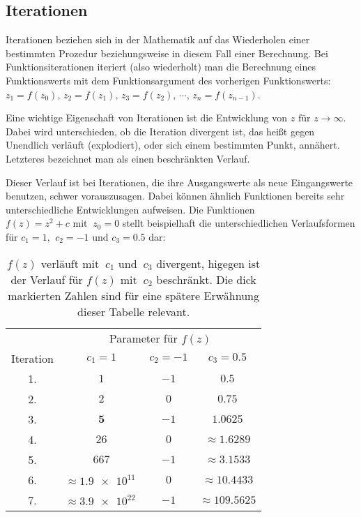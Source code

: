 \subsection{Iterationen}\label{subsec:iterations}

Iterationen beziehen sich in der Mathematik auf das Wiederholen einer bestimmten
Prozedur beziehungsweise in diesem Fall einer Berechnung.
Bei Funktionsiterationen iteriert (also wiederholt) man die Berechnung eines
Funktionswerts mit dem Funktionsargument des vorherigen Funktionswerts:
$z_1 = f(z_0),\, z_2 = f(z_1),\, z_3 = f(z_2),\, \cdots,\, z_n = f(z_{n-1})$.

Eine wichtige Eigenschaft von Iterationen ist die Entwicklung von
$z \text{ für } z \to \infty$.
Dabei wird unterschieden, ob die Iteration divergent ist,
das heißt gegen Unendlich verl\"auft (\glqq explodiert\grqq),
oder sich einem bestimmten Punkt, ann\"ahert.
Letzteres bezeichnet man als einen beschränkten Verlauf.

Dieser Verlauf ist bei Iterationen, die ihre Ausgangswerte als neue Eingangswerte
benutzen, schwer vorauszusagen.
Dabei k\"onnen \"ahnlich Funktionen bereits sehr unterschiedliche Entwicklungen aufweisen.
Die Funktionen $f(z) = z^2 + c \text{ mit }\ z_0 = 0$ stellt beispielhaft
die unterschiedlichen Verlaufsformen für
$c_1 = 1 \text{, }\ c_2 = -1 \text{ und } c_3 = 0.5$ dar:

\begin{table}[h!]
  \centering
  \begin{tabular}{@{}cccc@{}}
    \toprule
    & \multicolumn{3}{c}{Parameter für $f(z)$} \\
    \cmidrule(lr){2-4}
    Iteration & $ c_1 = 1$ & $ c_2 = -1$ & $ c_3 = 0.5$ \\
    \midrule
    1. & $1$ & $-1$ & $0.5$ \\
    2. & $2$ & $0$ & $0.75$ \\
    3. & $\boldsymbol{5}$ & $-1$ & $1.0625$ \\
    4. & $26$ & $0$ & $\approx 1.6289 $ \\
    5. & $667$ & $-1$ & $\approx \boldsymbol{3.1533} $ \\
    6. & $\approx \num{1,9e11}\ $ & $0$ & $\approx 10.4433 $ \\
    7. & $\approx \num{3,9e22}\ $ & $-1$ & $\approx 109.5625 $ \\
    \bottomrule
  \end{tabular}
  \caption{
    $f(z) \text{ verl\"auft mit }\ c_1 \text{ und }\ c_3$ divergent,
    higegen ist der Verlauf f\"ur $f(z) \text{ mit }\ c_2$ beschr\"ankt.
    Die dick markierten Zahlen sind für eine spätere Erwähnung dieser Tabelle
    relevant.
  }
  \label{tab:iterations-example}
\end{table}